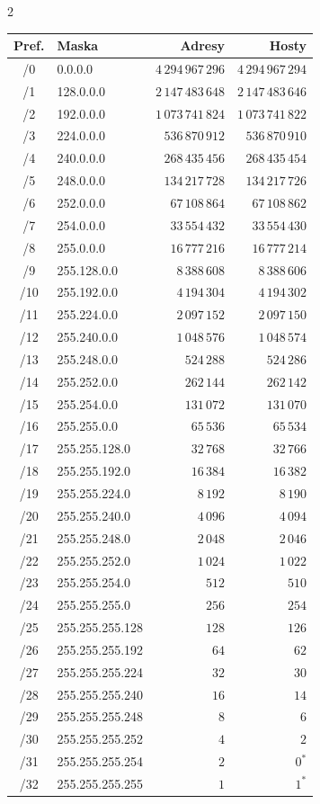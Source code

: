 \documentclass[9pt,a4paper,landscape]{article}
\begin{document}
\begin{multicols*}{2}
{\scriptsize
\setlength{\tabcolsep}{2pt}
\renewcommand{\arraystretch}{0.9}
\begin{tabular}{@{}c l r r@{}}
\toprule
Pref. & Maska & Adresy & Hosty \\
\midrule
/0 & 0.0.0.0 & \(4\,294\,967\,296\) & \(4\,294\,967\,294\) \\
/1 & 128.0.0.0 & \(2\,147\,483\,648\) & \(2\,147\,483\,646\) \\
/2 & 192.0.0.0 & \(1\,073\,741\,824\) & \(1\,073\,741\,822\) \\
/3 & 224.0.0.0 & \(536\,870\,912\) & \(536\,870\,910\) \\
/4 & 240.0.0.0 & \(268\,435\,456\) & \(268\,435\,454\) \\
/5 & 248.0.0.0 & \(134\,217\,728\) & \(134\,217\,726\) \\
/6 & 252.0.0.0 & \(67\,108\,864\) & \(67\,108\,862\) \\
/7 & 254.0.0.0 & \(33\,554\,432\) & \(33\,554\,430\) \\
/8 & 255.0.0.0 & \(16\,777\,216\) & \(16\,777\,214\) \\
/9 & 255.128.0.0 & \(8\,388\,608\) & \(8\,388\,606\) \\
/10 & 255.192.0.0 & \(4\,194\,304\) & \(4\,194\,302\) \\
/11 & 255.224.0.0 & \(2\,097\,152\) & \(2\,097\,150\) \\
/12 & 255.240.0.0 & \(1\,048\,576\) & \(1\,048\,574\) \\
/13 & 255.248.0.0 & \(524\,288\) & \(524\,286\) \\
/14 & 255.252.0.0 & \(262\,144\) & \(262\,142\) \\
/15 & 255.254.0.0 & \(131\,072\) & \(131\,070\) \\
/16 & 255.255.0.0 & \(65\,536\) & \(65\,534\) \\
/17 & 255.255.128.0 & \(32\,768\) & \(32\,766\) \\
/18 & 255.255.192.0 & \(16\,384\) & \(16\,382\) \\
/19 & 255.255.224.0 & \(8\,192\) & \(8\,190\) \\
/20 & 255.255.240.0 & \(4\,096\) & \(4\,094\) \\
/21 & 255.255.248.0 & \(2\,048\) & \(2\,046\) \\
/22 & 255.255.252.0 & \(1\,024\) & \(1\,022\) \\
/23 & 255.255.254.0 & \(512\) & \(510\) \\
/24 & 255.255.255.0 & \(256\) & \(254\) \\
/25 & 255.255.255.128 & \(128\) & \(126\) \\
/26 & 255.255.255.192 & \(64\) & \(62\) \\
/27 & 255.255.255.224 & \(32\) & \(30\) \\
/28 & 255.255.255.240 & \(16\) & \(14\) \\
/29 & 255.255.255.248 & \(8\) & \(6\) \\
/30 & 255.255.255.252 & \(4\) & \(2\) \\
/31 & 255.255.255.254 & \(2\) & \(0^\ast\) \\
/32 & 255.255.255.255 & \(1\) & \(1^\ast\) \\
\bottomrule
\end{tabular}
}


\end{multicols*}
\end{document}
